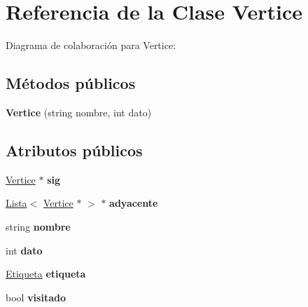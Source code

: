 \hypertarget{classVertice}{}\section{Referencia de la Clase Vertice}
\label{classVertice}


Diagrama de colaboración para Vertice\+:
\subsection*{Métodos públicos}
\begin{DoxyCompactItemize}
\item 
\mbox{\label{classVertice_a7aff8f5bebd64a371708d72e12edc1dd}} 
{\bfseries Vertice} (string nombre, int dato)
\end{DoxyCompactItemize}
\subsection*{Atributos públicos}
\begin{DoxyCompactItemize}
\item 
\mbox{\label{classVertice_ad71c11896bd1657ca33117c1c2f08ed3}} 
\hyperlink{classVertice}{Vertice} $\ast$ {\bfseries sig}
\item 
\mbox{\label{classVertice_a740d1d3cf0a6fad9b0d49832e8c2cd55}} 
\hyperlink{classLista}{Lista}$<$ \hyperlink{classVertice}{Vertice} $\ast$ $>$ $\ast$ {\bfseries adyacente}
\item 
\mbox{\label{classVertice_ab23a005b5c7802792ec2277227ba4d83}} 
string {\bfseries nombre}
\item 
\mbox{\label{classVertice_accb96991da9db4ee82280acf2019d1dc}} 
int {\bfseries dato}
\item 
\mbox{\label{classVertice_af36574fd5dd94e1f7a57ef56e62213e6}} 
\hyperlink{classEtiqueta}{Etiqueta} {\bfseries etiqueta}
\item 
\mbox{\label{classVertice_a883addd1f202e3fbae518d32ee933c99}} 
bool {\bfseries visitado}
\end{DoxyCompactItemize}
